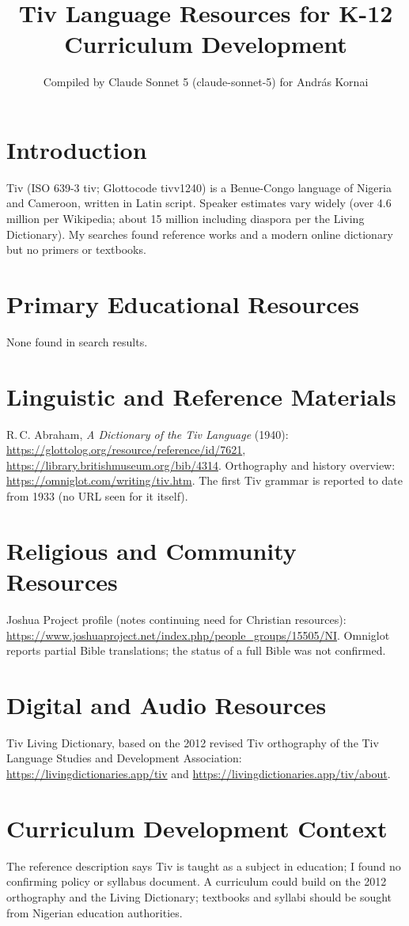 \documentclass[12pt]{article}
\title{Tiv Language Resources for K-12 Curriculum Development}
\author{Compiled by Claude Sonnet 5 (claude-sonnet-5) for Andr\'as Kornai}
\date{}
\begin{document}
\maketitle
\section{Introduction}
Tiv (ISO 639-3 tiv; Glottocode tivv1240) is a Benue-Congo language of Nigeria and Cameroon, written in Latin script. Speaker estimates vary widely (over 4.6 million per Wikipedia; about 15 million including diaspora per the Living Dictionary). My searches found reference works and a modern online dictionary but no primers or textbooks.
\section{Primary Educational Resources}
None found in search results.
\section{Linguistic and Reference Materials}
R.\,C. Abraham, \emph{A Dictionary of the Tiv Language} (1940): \url{https://glottolog.org/resource/reference/id/7621}, \url{https://library.britishmuseum.org/bib/4314}. Orthography and history overview: \url{https://omniglot.com/writing/tiv.htm}. The first Tiv grammar is reported to date from 1933 (no URL seen for it itself).
\section{Religious and Community Resources}
Joshua Project profile (notes continuing need for Christian resources): \url{https://www.joshuaproject.net/index.php/people_groups/15505/NI}. Omniglot reports partial Bible translations; the status of a full Bible was not confirmed.
\section{Digital and Audio Resources}
Tiv Living Dictionary, based on the 2012 revised Tiv orthography of the Tiv Language Studies and Development Association: \url{https://livingdictionaries.app/tiv} and \url{https://livingdictionaries.app/tiv/about}.
\section{Curriculum Development Context}
The reference description says Tiv is taught as a subject in education; I found no confirming policy or syllabus document. A curriculum could build on the 2012 orthography and the Living Dictionary; textbooks and syllabi should be sought from Nigerian education authorities.
\end{document}
